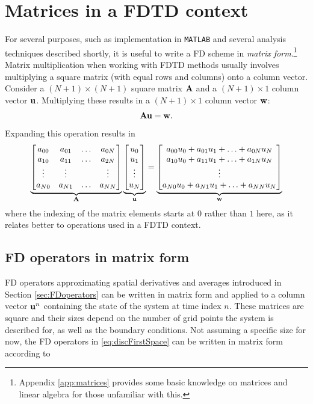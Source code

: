 \section{Matrices in a FDTD context}\label{sec:matricesFDTD}
For several purposes, such as implementation in \texttt{MATLAB} and several analysis techniques described shortly, it is useful to write a FD scheme in \textit{matrix form}.\footnote{Appendix \ref{app:matrices} provides some basic knowledge on matrices and linear algebra for those unfamiliar with this.} Matrix multiplication when working with FDTD methods usually involves multiplying a square matrix (with equal rows and columns) onto a column vector. Consider a $(N+1)\times (N+1)$ square matrix $\mathbf{A}$ and a $(N+1) \times 1$ column vector $\mathbf{u}$. Multiplying these results in a $(N+1) \times 1$ column vector $\mathbf{w}$:
\begin{equation}
    \mathbf{A}\mathbf{u} = \mathbf{w}.
\end{equation}
Expanding this operation results in
\begin{equation}
    \underbrace{\begin{bmatrix}
        a_{00} & a_{01} & \hdots & a_{0N}\\
        a_{10} & a_{11} & \hdots & a_{2N}\\
        \vdots & \vdots & &\vdots\\
        a_{N0} & a_{N1} & \hdots & a_{NN}
    \end{bmatrix}}_{\mathbf{A}}
    \underbrace{\begin{bmatrix}
        u_0\\
        u_1\\
        \vdots\\
        u_N
    \end{bmatrix}}_{\mathbf{u}} = 
    \underbrace{\begin{bmatrix}
        a_{00}u_0 + a_{01}u_1 + \hdots + a_{0N}u_N\\
        a_{10}u_0 + a_{11}u_1 + \hdots + a_{1N}u_N\\
        \vdots\\
        a_{N0}u_0 + a_{N1}u_1 + \hdots + a_{NN}u_N
    \end{bmatrix}}_{\mathbf{w}}
\end{equation}
where the indexing of the matrix elements starts at $0$ rather than $1$ here, as it relates better to operations used in a FDTD context.

\subsection{FD operators in matrix form}
FD operators approximating spatial derivatives and averages introduced in Section \ref{sec:FDoperators} can be written in matrix form and applied to a column vector $\mathbf{u}^n$ containing the state of the system at time index $n$. These matrices are square and their sizes depend on the number of grid points the system is described for, as well as the boundary conditions. Not assuming a specific size for now, the FD operators in \eqref{eq:discFirstSpace} can be written in matrix form according to
\setstacktabbedgap{4pt}
\def\lrgap{\kern3pt}

